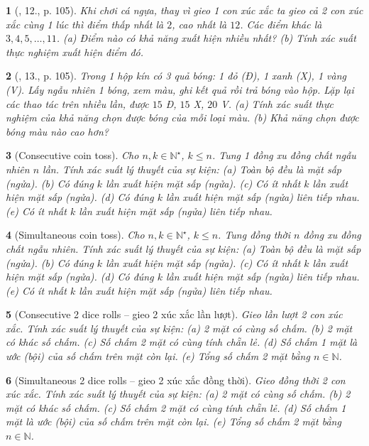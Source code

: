 \documentclass{article}
\newtheorem{baitoan}{}
\begin{document}
\begin{baitoan}[\cite{Tuyen_Toan_6}, 12., p. 105]
	Khi chơi cá ngựa, thay vì gieo 1 con xúc xắc ta gieo cả 2 con xúc xắc cùng 1 lúc thì điểm thấp nhất là $2$, cao nhất là $12$. Các điểm khác là $3,4,5,\ldots,11$. (a) Điểm nào có khả năng xuất hiện nhiều nhất? (b) Tính xác suất thực nghiệm xuất hiện điểm đó.
\end{baitoan}

\begin{baitoan}[\cite{Tuyen_Toan_6}, 13., p. 105]
	Trong 1 hộp kín có 3 quả bóng: 1 đỏ (Đ), 1 xanh (X), 1 vàng (V). Lấy ngẫu nhiên 1 bóng, xem màu, ghi kết quả rồi trả bóng vào hộp. Lặp lại các thao tác trên nhiều lần, được $15$ Đ, $15$ X, $20$ V. (a) Tính xác suất thực nghiệm của khả năng chọn được bóng của mỗi loại màu. (b) Khả năng chọn được bóng màu nào cao hơn?
\end{baitoan}

\begin{baitoan}[Consecutive coin toss]
	Cho $n,k\in\mathbb{N}^\star$, $k\le n$. Tung 1 đồng xu đồng chất ngẫu nhiên $n$ lần. Tính xác suất lý thuyết của sự kiện: (a) Toàn bộ đều là mặt sấp (ngửa). (b) Có đúng $k$ lần xuất hiện mặt sấp (ngửa). (c) Có ít nhất $k$ lần xuất hiện mặt sấp (ngửa). (d) Có đúng $k$ lần xuất hiện mặt sấp (ngửa) liên tiếp nhau. (e) Có ít nhất $k$ lần xuất hiện mặt sấp (ngửa) liên tiếp nhau.
\end{baitoan}

\begin{baitoan}[Simultaneous coin toss]
	Cho $n,k\in\mathbb{N}^\star$, $k\le n$. Tung đồng thời $n$ đồng xu đồng chất ngẫu nhiên. Tính xác suất lý thuyết của sự kiện: (a) Toàn bộ đều là mặt sấp (ngửa). (b) Có đúng $k$ lần xuất hiện mặt sấp (ngửa). (c) Có ít nhất $k$ lần xuất hiện mặt sấp (ngửa). (d) Có đúng $k$ lần xuất hiện mặt sấp (ngửa) liên tiếp nhau. (e) Có ít nhất $k$ lần xuất hiện mặt sấp (ngửa) liên tiếp nhau.
\end{baitoan}

\begin{baitoan}[Consecutive 2 dice rolls -- gieo 2 xúc xắc lần lượt]
	Gieo lần lượt 2 con xúc xắc. Tính xác suất lý thuyết của sự kiện: (a) 2 mặt có cùng số chấm. (b) 2 mặt có khác số chấm. (c) Số chấm 2 mặt có cùng tính chẵn lẻ. (d) Số chấm 1 mặt là ước (bội) của số chấm trên mặt còn lại. (e) Tổng số chấm 2 mặt bằng $n\in\mathbb{N}$.
\end{baitoan}

\begin{baitoan}[Simultaneous 2 dice rolls -- gieo 2 xúc xắc đồng thời]
	Gieo đồng thời 2 con xúc xắc. Tính xác suất lý thuyết của sự kiện: (a) 2 mặt có cùng số chấm. (b) 2 mặt có khác số chấm. (c) Số chấm 2 mặt có cùng tính chẵn lẻ. (d) Số chấm 1 mặt là ước (bội) của số chấm trên mặt còn lại. (e) Tổng số chấm 2 mặt bằng $n\in\mathbb{N}$.
\end{baitoan}
\end{document}

